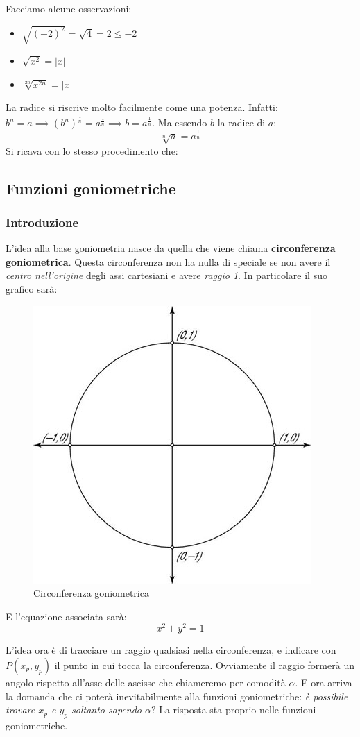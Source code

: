 Facciamo alcune osservazioni:
\begin{itemize}
    \item $\sqrt{(-2)^2}=\sqrt{4}= 2 \leq -2$
    \item $\sqrt{x^2} = |x|$
    \item $\sqrt[2n]{x^{2n}} = |x|$
\end{itemize}
La radice si riscrive molto facilmente come una potenza. Infatti: $b^n = a \implies (b^n)^\frac{1}{n} = a^\frac{1}{n} \implies b = a^\frac{1}{n}$. Ma essendo $b$ la radice di $a$:
\begin{equation*}
    \sqrt[n]{a} = a^\frac{1}{n}
\end{equation*}
Si ricava con lo stesso procedimento che:

\subsection{Funzioni goniometriche}
\subsubsection{Introduzione}
L'idea alla base goniometria nasce da quella che viene chiama \textbf{circonferenza goniometrica}. Questa circonferenza non ha nulla di speciale se non avere il \textit{centro nell'origine} degli assi cartesiani e avere \textit{raggio 1}. In particolare il suo grafico sarà:
\begin{figure}[H] %
    \centering
    \includegraphics[width=0.3\linewidth]{../img/unitCircle.jpg}
    \caption{Circonferenza goniometrica}
\end{figure}

E l'equazione associata sarà:
\begin{equation*}
    x^2+y^2=1
\end{equation*}

L'idea ora è di tracciare un raggio qualsiasi nella circonferenza, e indicare con $P(x_p, y_p)$ il punto in cui tocca la circonferenza. Ovviamente il raggio formerà un angolo rispetto all'asse delle ascisse che chiameremo per comodità $\alpha$. E ora arriva la domanda che ci poterà inevitabilmente alla funzioni goniometriche: \textit{è possibile trovare $x_p$ e $y_p$ soltanto sapendo $\alpha$}? La risposta sta proprio nelle funzioni goniometriche.


